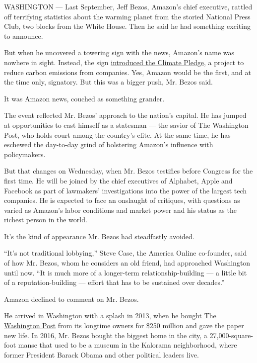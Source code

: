 WASHINGTON --- Last September, Jeff Bezos, Amazon's chief executive,
rattled off terrifying statistics about the warming planet from the
storied National Press Club, two blocks from the White House. Then he
said he had something exciting to announce.

But when he uncovered a towering sign with the news, Amazon's name was
nowhere in sight. Instead, the sign
\href{https://www.nytimes.com/2019/09/19/technology/amazon-carbon-neutral.html}{introduced
the Climate Pledge}, a project to reduce carbon emissions from
companies. Yes, Amazon would be the first, and at the time only,
signatory. But this was a bigger push, Mr. Bezos said.

It was Amazon news, couched as something grander.

The event reflected Mr. Bezos' approach to the nation's capital. He has
jumped at opportunities to cast himself as a statesman --- the savior of
The Washington Post, who holds court among the country's elite. At the
same time, he has eschewed the day-to-day grind of bolstering Amazon's
influence with policymakers.

But that changes on Wednesday, when Mr. Bezos testifies before Congress
for the first time. He will be joined by the chief executives of
Alphabet, Apple and Facebook as part of lawmakers' investigations into
the power of the largest tech companies. He is expected to face an
onslaught of critiques, with questions as varied as Amazon's labor
conditions and market power and his status as the richest person in the
world.

It's the kind of appearance Mr. Bezos had steadfastly avoided.

``It's not traditional lobbying,'' Steve Case, the America Online
co-founder, said of how Mr. Bezos, whom he considers an old friend, had
approached Washington until now. ``It is much more of a longer-term
relationship-building --- a little bit of a reputation-building ---
effort that has to be sustained over decades.''

Amazon declined to comment on Mr. Bezos.

He arrived in Washington with a splash in 2013, when he
\href{https://www.nytimes.com/2013/08/06/business/media/a-mogul-gets-a-landmark-in-the-capital.html}{bought
The Washington Post} from its longtime owners for \$250 million and gave
the paper new life. In 2016, Mr. Bezos bought the biggest home in the
city, a 27,000-square-foot manse that used to be a museum in the
Kalorama neighborhood, where former President Barack Obama and other
political leaders live.

